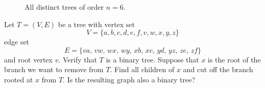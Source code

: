 \begin{figure}[!htbp]
{}
\quad
{}
\quad
{}
\quad
{}
\caption{All distinct trees of order $n = 6$.}
\label{fig:trees_forests:distinct_trees_specified_order_6}
\end{figure}

\begin{example}
\label{eg:trees_forests:branch_cut_binary_tree}
Let $T = (V, E)$ be a tree with vertex set
\[
V
=
\{a, b, c, d, e, f, v, w, x, y, z\}
\]
edge set
\[
E
=
\{va,\, vw,\, wx,\, wy,\, xb,\, xc,\, yd,\, yz,\, ze,\, zf\}
\]
and root vertex $v$. Verify that $T$ is a binary
tree. Suppose that $x$ is the root of the branch we
want to remove from $T$. Find all children of $x$ and
cut off the branch rooted at $x$ from $T$. Is the
resulting graph also a binary tree?
\end{example}

